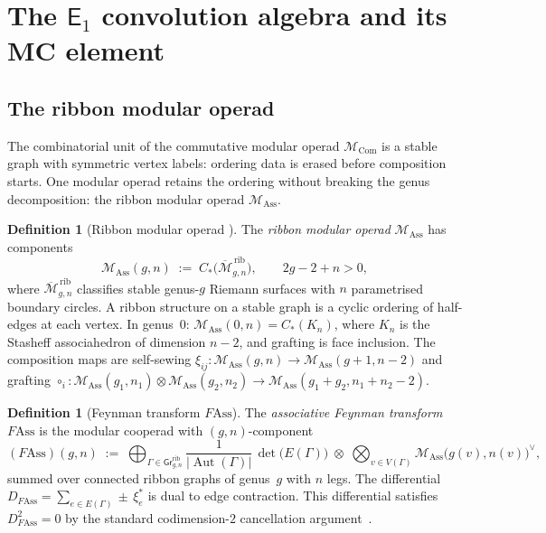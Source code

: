 \documentclass[11pt,reqno]{amsart}
\theoremstyle{definition}
\newtheorem{definition}[theorem]{Definition}
\theoremstyle{remark}
\newcommand{\cM}{\mathcal{M}}
\newcommand{\Eone}{\mathsf{E}_{1}}
\newcommand{\Ass}{\mathrm{Ass}}
\newcommand{\Com}{\mathrm{Com}}
\DeclareMathOperator{\Aut}{Aut}
\newcommand{\FMAss}{F\!\Ass}
\numberwithin{equation}{section}
\begin{document}
\section{The $\Eone$ convolution algebra and its MC element}
\label{sec:e1-convolution}

\subsection{The ribbon modular operad}

The combinatorial unit of the commutative modular operad
$\cM_\Com$ is a stable graph with symmetric vertex labels: ordering
data is erased before composition starts. One modular operad retains
the ordering without breaking the genus decomposition: the ribbon
modular operad $\cM_\Ass$.

\begin{definition}[Ribbon modular operad {\cite{GK98,CG17}}]
\label{def:ribbon-modular-operad}
The \emph{ribbon modular operad} $\cM_\Ass$ has components
\begin{equation}\label{eq:ribbon-mod-operad}
  \cM_\Ass(g,n)
  \;:=\;
  C_*\!\bigl(\overline{\cM}_{g,n}^{\,\mathrm{rib}}\bigr),
  \qquad 2g-2+n > 0,
\end{equation}
where $\overline{\cM}_{g,n}^{\,\mathrm{rib}}$ classifies stable
genus-$g$ Riemann surfaces with $n$ parametrised boundary circles.
A ribbon structure on a stable graph is a cyclic ordering of
half-edges at each vertex. In genus~$0$:
$\cM_\Ass(0,n) = C_*(K_n)$, where $K_n$ is the Stasheff
associahedron of dimension $n-2$, and grafting is face inclusion.
The composition maps are self-sewing
$\xi_{ij}\colon \cM_\Ass(g,n) \to \cM_\Ass(g+1,n-2)$ and
grafting
$\circ_i\colon \cM_\Ass(g_1,n_1) \otimes \cM_\Ass(g_2,n_2)
\to \cM_\Ass(g_1+g_2,n_1+n_2-2)$.
\end{definition}

\begin{definition}[Feynman transform $\FMAss$]
\label{def:fass}
The \emph{associative Feynman transform} $\FMAss$ is the modular
cooperad with $(g,n)$-component
\begin{equation}\label{eq:fass-def}
  (\FMAss)(g,n)
  \;:=\;
  \bigoplus_{\Gamma \in \mathsf{Gr}^{\mathrm{rib}}_{g,n}}
  \frac{1}{|\Aut(\Gamma)|}\,
  \det\bigl(E(\Gamma)\bigr)
  \;\otimes\;
  \bigotimes_{v \in V(\Gamma)}
  \cM_\Ass\bigl(g(v),n(v)\bigr)^\vee,
\end{equation}
summed over connected ribbon graphs of genus~$g$ with $n$ legs.
The differential
$D_{\FMAss} = \sum_{e \in E(\Gamma)} \pm\, \xi_e^*$
is dual to edge contraction. This differential satisfies
$D_{\FMAss}^2 = 0$ by the standard codimension-$2$ cancellation
argument~\cite{GK98}.
\end{definition}
\end{document}
